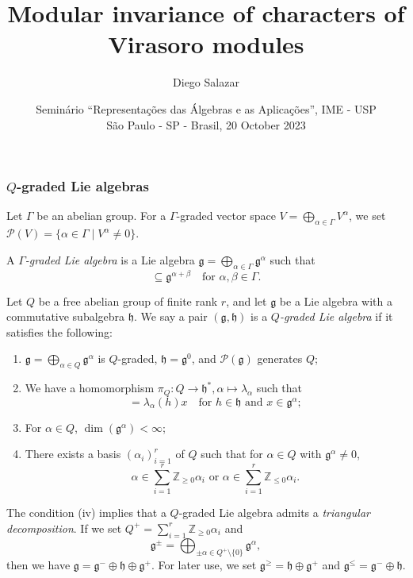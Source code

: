 \documentclass{beamer}
\title[Modular inv.\ of char.\ of Virasoro modules]{Modular invariance of characters of Virasoro modules}
\author[Salazar]{Diego Salazar\inst{1}}
\institute[IMPA]{\inst{1} Instituto de Matemática Pura e Aplicada (IMPA)}
\date[20 October 2023]{Seminário ``Representações das Álgebras e as Aplicações'', IME - USP \\
  São Paulo - SP - Brasil, 20 October 2023}
\begin{document}
\maketitle

\begin{frame}
  \frametitle{$Q$-graded Lie algebras}
  Let $\Gamma$ be an abelian group.
  For a $\Gamma$-graded vector space $V = \bigoplus_{\alpha \in \Gamma}V^{\alpha}$, we set $\mathcal{P}(V) = \{\alpha \in \Gamma \mid V^{\alpha} \neq 0\}$.

  A \emph{$\Gamma$-graded Lie algebra} is a Lie algebra $\mathfrak{g} = \bigoplus_{\alpha \in \Gamma}\mathfrak{g}^{\alpha}$ such that
  \begin{equation*}
    [\mathfrak{g}^{\alpha}, \mathfrak{g}^{\beta}] \subseteq \mathfrak{g}^{\alpha + \beta} \quad \text{for $\alpha, \beta \in \Gamma$}.
  \end{equation*}

  Let $Q$ be a free abelian group of finite rank $r$, and let $\mathfrak{g}$ be a Lie algebra with a commutative subalgebra $\mathfrak{h}$.
  We say a pair $(\mathfrak{g}, \mathfrak{h})$ is a \emph{$Q$-graded Lie algebra} if it satisfies the following:
  \begin{enumerate}
  \item $\mathfrak{g} = \bigoplus_{\alpha \in Q}\mathfrak{g}^{\alpha}$ is $Q$-graded, $\mathfrak{h} = \mathfrak{g}^0$, and $\mathcal{P}(\mathfrak{g})$ generates $Q$;
  \item We have a homomorphism $\pi_Q: Q \to \mathfrak{h}^*, \alpha \mapsto \lambda_{\alpha}$ such  that
    \begin{equation*}
      [h, x] = \lambda_{\alpha}(h)x \quad \text{for $h \in \mathfrak{h}$ and $x \in \mathfrak{g}^{\alpha}$};
    \end{equation*}
  \item For $\alpha \in Q$, $\dim(\mathfrak{g}^{\alpha}) < \infty$;
  \item There exists a basis $(\alpha_i)_{i = 1}^r$ of $Q$ such that for $\alpha \in Q$ with $\mathfrak{g}^{\alpha} \neq 0$,
    \begin{equation*}
      \text{$\alpha \in \sum_{i = 1}^r\mathbb{Z}_{\ge 0}\alpha_i$ or $\alpha \in \sum_{i = 1}^r\mathbb{Z}_{\le 0}\alpha_i$}.
    \end{equation*}
  \end{enumerate}
\end{frame}

\begin{frame}
  The condition (iv) implies that a $Q$-graded Lie algebra admits a \emph{triangular decomposition}.
  If we set $Q^+ = \sum_{i = 1}^r\mathbb{Z}_{\ge 0}\alpha_i$ and
  \begin{equation*}
    \mathfrak{g}^{\pm} = \bigoplus_{\pm \alpha \in Q^+ \setminus \{0\}}\mathfrak{g}^{\alpha},
  \end{equation*}
  then we have $\mathfrak{g} = \mathfrak{g}^- \oplus \mathfrak{h} \oplus \mathfrak{g}^+$.
  For later use, we set $\mathfrak{g}^{\ge} = \mathfrak{h} \oplus \mathfrak{g}^+$ and $\mathfrak{g}^{\le} = \mathfrak{g}^- \oplus \mathfrak{h}$.
\end{frame}
\end{document}
